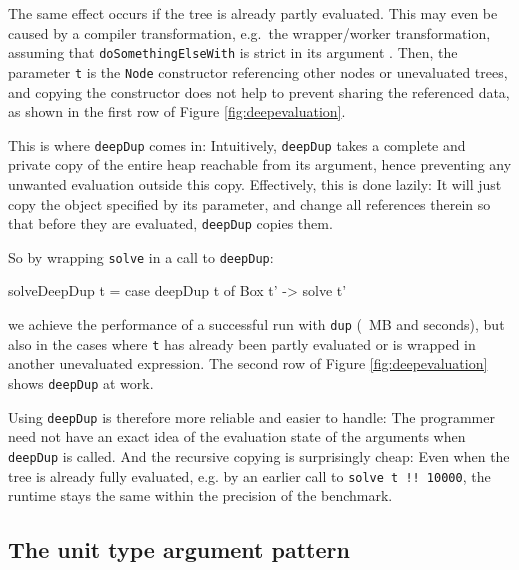 \documentclass[preprint]{sigplanconf}
\theoremstyle{nonumberplain}
\newcommand{\li}{\lstinline[style=Haskell]}
\begin{document}
The same effect occurs if the tree is already partly evaluated. This may even be caused by a compiler transformation, e.g.\ the wrapper/worker transformation, assuming that \li-doSomethingElseWith- is strict  in its argument \citep{unboxed}. Then, the parameter \li-t- is the \li-Node- constructor referencing other nodes or unevaluated trees, and copying the constructor does not help to prevent sharing the referenced data, as shown in the first row of Figure \ref{fig:deepevaluation}.

This is where \li-deepDup- comes in:
Intuitively, \li-deepDup- takes a complete and private copy of the entire heap reachable from its argument, hence preventing any unwanted evaluation outside this copy. Effectively, this is done lazily: It will just copy the object specified by its parameter, and change all references therein so that before they are evaluated, \li-deepDup- copies them.

So by wrapping \li-solve- in a call to \li-deepDup-:
\begin{haskell}
solveDeepDup t = case deepDup t of Box t' -> solve t'
\end{haskell}
we achieve the performance of a successful run with \li-dup- (~MB and  seconds), but also in the cases where \li-t- has already been partly evaluated or is wrapped in another unevaluated expression. The second row of Figure \ref{fig:deepevaluation} shows \li-deepDup- at work.

Using \li-deepDup- is therefore more reliable and easier to handle: The programmer need not have an exact idea of the evaluation state of the arguments when \li-deepDup- is called. And the recursive copying is surprisingly cheap: Even when the tree is already fully evaluated, e.g. by an earlier call to \li-solve t !! 10000-, the runtime stays the same within the precision of the benchmark.



\subsection{The unit type argument pattern}
\end{document}
